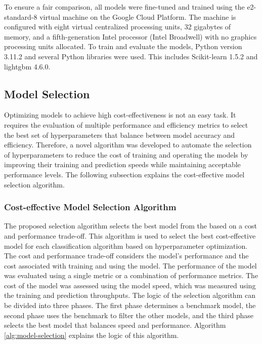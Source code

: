 To ensure a fair comparison, all models were fine-tuned and trained using the e2-standard-8 virtual machine on the Google Cloud Platform. The machine is configured with eight virtual centralized processing units, 32 gigabytes of memory, and a fifth-generation Intel processor (Intel Broadwell) with no graphics processing units allocated. To train and evaluate the models, Python version 3.11.2 and several Python libraries were used. This includes Scikit-learn 1.5.2 and lightgbm 4.6.0.

\subsection{Model Selection}
Optimizing models to achieve high cost-effectiveness is not an easy task. It requires the evaluation of multiple performance and efficiency metrics to select the best set of hyperparameters that balance between model accuracy and efficiency. Therefore, a novel algorithm was developed to automate the selection of hyperparameters to reduce the cost of training and operating the models by improving their training and prediction speeds while maintaining acceptable performance levels. The following subsection explains the cost-effective model selection algorithm.

\subsubsection{Cost-effective Model Selection Algorithm}
\label{sec:cost-effective-model-selection-algorithm}
The proposed selection algorithm selects the best model from the based on a cost and performance trade-off. This algorithm is used to select the best cost-effective model for each classification algorithm based on hyperparameter optimization. The cost and performance trade-off considers the model's performance and the cost associated with training and using the model. The performance of the model was evaluated using a single metric or a combination of performance metrics. The cost of the model was assessed using the model speed, which was measured using the training and prediction throughputs. The logic of the selection algorithm can be divided into three phases. The first phase determines a benchmark model, the second phase uses the benchmark to filter the other models, and the third phase selects the best model that balances speed and performance. Algorithm \ref{alg:model-selection} explains the logic of this algorithm.

